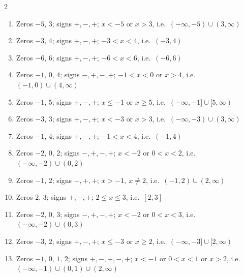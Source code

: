 \documentclass[11pt]{article}
\begin{document}
\begin{keybox}
\begin{multicols}{2}
\small
\begin{enumerate}[leftmargin=*,itemsep=3pt]
  \item Zeros $-5,\,3$; signs $+,-,+$; $x<-5\text{ or }x>3$, i.e.\ $(-\infty,-5)\cup(3,\infty)$
  \item Zeros $-3,\,4$; signs $+,-,+$; $-3<x<4$, i.e.\ $(-3,4)$
  \item Zeros $-6,\,6$; signs $+,-,+$; $-6<x<6$, i.e.\ $(-6,6)$
  \item Zeros $-1,\,0,\,4$; signs $-,+,-,+$; $-1<x<0\text{ or }x>4$, i.e.\ $(-1,0)\cup(4,\infty)$
  \item Zeros $-1,\,5$; signs $+,-,+$; $x\le-1\text{ or }x\ge5$, i.e.\ $(-\infty,-1]\cup[5,\infty)$
  \item Zeros $-3,\,3$; signs $+,-,+$; $x<-3\text{ or }x>3$, i.e.\ $(-\infty,-3)\cup(3,\infty)$
  \item Zeros $-1,\,4$; signs $+,-,+$; $-1<x<4$, i.e.\ $(-1,4)$
  \item Zeros $-2,\,0,\,2$; signs $-,+,-,+$; $x<-2\text{ or }0<x<2$, i.e.\ $(-\infty,-2)\cup(0,2)$
  \item Zeros $-1,\,2$; signs $-,+,+$; $x>-1,\ x\ne2$, i.e.\ $(-1,2)\cup(2,\infty)$
  \item Zeros $2,\,3$; signs $+,-,+$; $2\le x\le 3$, i.e.\ $[2,3]$
  \item Zeros $-2,\,0,\,3$; signs $-,+,-,+$; $x<-2\text{ or }0<x<3$, i.e.\ $(-\infty,-2)\cup(0,3)$
  \item Zeros $-3,\,2$; signs $+,-,+$; $x\le-3\text{ or }x\ge2$, i.e.\ $(-\infty,-3]\cup[2,\infty)$
  \item Zeros $-1,\,0,\,1,\,2$; signs $+,-,+,-,+$; $x<-1\text{ or }0<x<1\text{ or }x>2$, i.e.\ $(-\infty,-1)\cup(0,1)\cup(2,\infty)$
\end{enumerate}
\end{multicols}
\end{keybox}
\end{document}
